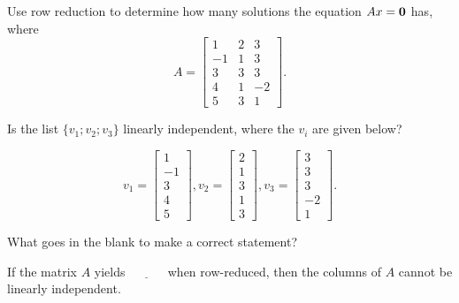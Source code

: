 
Use row reduction to determine how many solutions the equation $Ax = \mathbf{0}$ has, where 
\[ A = \left[\begin{array}{ccc} 1 & 2 & 3 \\ -1 & 1 & 3 \\ 3 & 3 & 3 \\ 4 & 1 & -2 \\
5  & 3 & 1 \end{array} \right]. \]




Is the list $\{v_1; v_2; v_3\}$ linearly independent, where the $v_i$ are given below?

\[v_1 = \left[\begin{array}{c} 1 \\ -1  \\ 3 \\ 4 \\5 \end{array} \right], 
v_2 = \left[\begin{array}{c} 2 \\ 1  \\ 3 \\ 1 \\ 3 \end{array} \right],  
v_3 = \left[\begin{array}{c} 3 \\ 3  \\ 3 \\ -2 \\ 1 \end{array} \right]. \]



\edXsolution{ 
}
\endedxproblem






What goes in the blank to make a correct statement?

If the matrix $A$ yields $\underline{\;\;\;\;\;\;\;\;\;\;}$ when row-reduced, then
the columns of $A$ cannot be linearly independent.  


